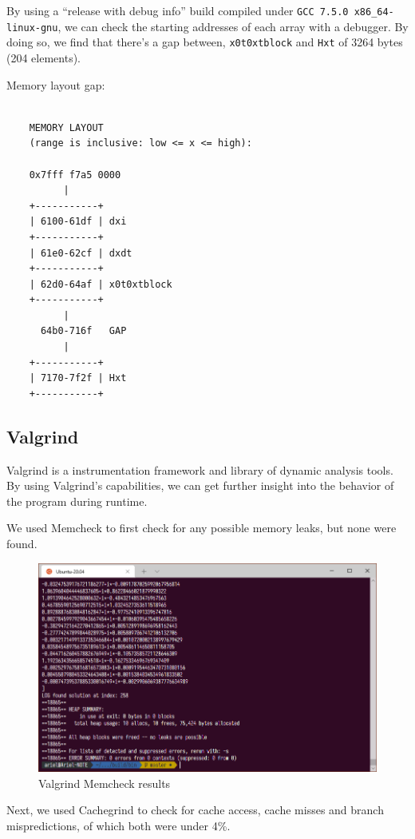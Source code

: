 By using a ``release with debug info'' build compiled under
\verb|GCC 7.5.0 x86_64-linux-gnu|, we can check the starting addresses of
each array with a debugger. By doing so, we find that there's a gap between,
\verb|x0t0xtblock| and \verb|Hxt| of 3264 bytes (204 elements).

Memory layout gap:
\footnotesize\begin{verbatim}

    MEMORY LAYOUT
    (range is inclusive: low <= x <= high):

    0x7fff f7a5 0000
          |
    +-----------+
    | 6100-61df | dxi
    +-----------+
    | 61e0-62cf | dxdt
    +-----------+
    | 62d0-64af | x0t0xtblock
    +-----------+
          |
      64b0-716f   GAP
          |
    +-----------+
    | 7170-7f2f | Hxt
    +-----------+
\end{verbatim}
\normalsize

\subsection{Valgrind}

Valgrind is a instrumentation framework and library of dynamic analysis tools.
By using Valgrind's capabilities, we can get further insight into the behavior
of the program during runtime.

We used Memcheck to first check for any possible memory leaks, but none were
found.

\begin{figure}[H]
    \includegraphics[width=\columnwidth]{figs/valgrind_memcheck}
    \caption{Valgrind Memcheck results}
\end{figure}

Next, we used Cachegrind to check for cache access, cache misses and branch
mispredictions, of which both were under 4\%.


